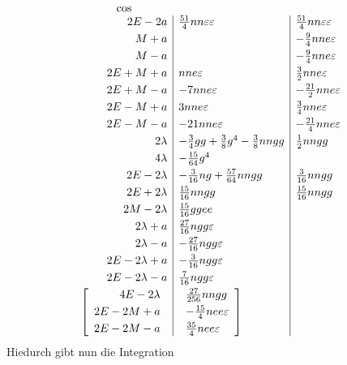 \begingroup
\renewcommand{\thefootnote}{}
\endgroup
{}
\[
\begin{array}{r|l|l}
\multicolumn{1}{c}{\cos}&\multicolumn{1}{c}{}&\\
2E-2a&\tfrac{51}{4}nn\varepsilon\varepsilon&\tfrac{51}{4}nn\varepsilon\varepsilon\\[3pt]
M+a&&-\tfrac94nne\varepsilon\\[3pt]
M-a&&-\tfrac94nne\varepsilon\\[3pt]
2E+M+a&nne\varepsilon&\tfrac32nne\varepsilon\\[3pt]
2E+M-a&-7nne\varepsilon&-\tfrac{21}{2}nne\varepsilon\\[3pt]
2E-M+a&3nne\varepsilon&\tfrac34nne\varepsilon\\[3pt]
2E-M-a&-21nne\varepsilon&-\tfrac{21}{4}nne\varepsilon\\[3pt]
2\lambda&-\tfrac34gg+\tfrac38g^4-\tfrac38nngg&\tfrac12nngg\\[3pt]
4\lambda&-\tfrac{15}{64}g^4&\\[3pt]
2E-2\lambda&-\tfrac{3}{16}ng+\tfrac{57}{64}nngg&\tfrac{3}{16}nngg\\[3pt]
2E+2\lambda&\tfrac{15}{16}nngg&\tfrac{15}{16}nngg\\[3pt]
2M-2\lambda&\tfrac{15}{16}ggee&\\[3pt]
2\lambda+a&\tfrac{27}{16}ngg\varepsilon&\\[3pt]
2\lambda-a&-\tfrac{27}{16}ngg\varepsilon&\\[3pt]
2E-2\lambda+a&-\tfrac{3}{16}ngg\varepsilon&\\[3pt]
2E-2\lambda-a&\tfrac{7}{16}ngg\varepsilon&\\[3pt]
\left[\begin{array}{r}
4E-2\lambda\\[3pt]
2E-2M+a\\[3pt]
2E-2M-a
\end{array}\right.&
\left.\begin{array}{l}
\tfrac{27}{256}nngg\\[3pt]
-\tfrac{15}{4}nee\varepsilon\\[3pt]
\tfrac{35}{4}nee\varepsilon
\end{array}\right]&
\end{array}
\]
\noindent Hiedurch gibt nun die Integration

